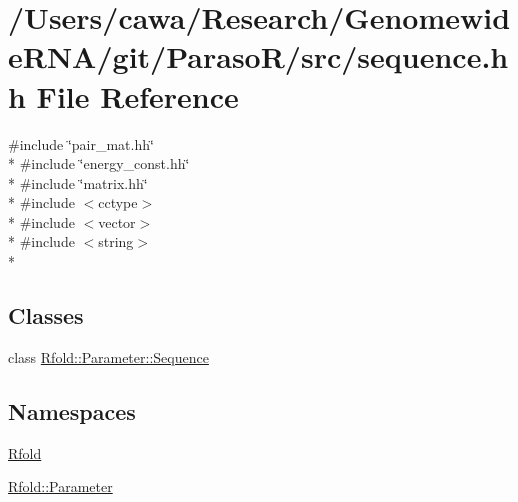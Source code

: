 \hypertarget{sequence_8hh}{\section{/\+Users/cawa/\+Research/\+Genomewide\+R\+N\+A/git/\+Paraso\+R/src/sequence.hh File Reference}
\label{sequence_8hh}
}
{\ttfamily \#include \char`\"{}pair\+\_\+mat.\+hh\char`\"{}}\\*
{\ttfamily \#include \char`\"{}energy\+\_\+const.\+hh\char`\"{}}\\*
{\ttfamily \#include \char`\"{}matrix.\+hh\char`\"{}}\\*
{\ttfamily \#include $<$cctype$>$}\\*
{\ttfamily \#include $<$vector$>$}\\*
{\ttfamily \#include $<$string$>$}\\*
\subsection*{Classes}
\begin{DoxyCompactItemize}
\item 
class \hyperlink{class_rfold_1_1_parameter_1_1_sequence}{Rfold\+::\+Parameter\+::\+Sequence}
\end{DoxyCompactItemize}
\subsection*{Namespaces}
\begin{DoxyCompactItemize}
\item 
 \hyperlink{namespace_rfold}{Rfold}
\item 
 \hyperlink{namespace_rfold_1_1_parameter}{Rfold\+::\+Parameter}
\end{DoxyCompactItemize}

